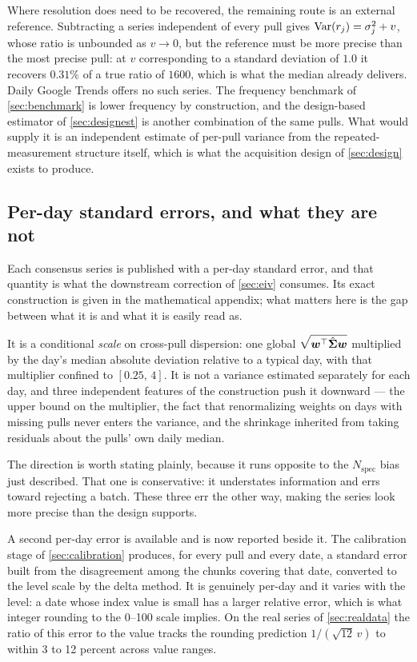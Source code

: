 \documentclass[12pt,a4paper,oneside]{article}
\begin{document}
Where resolution does need to be recovered, the remaining route is an external
reference. Subtracting a series independent of every pull gives
$\operatorname{Var}(r_j)=\sigma_j^2+v$, whose ratio is unbounded as $v\to 0$, but the reference
must be more precise than the most precise pull: at $v$ corresponding to a
standard deviation of $1.0$ it recovers $0.31\%$ of a true ratio of $1600$, which
is what the median already delivers. Daily Google Trends offers no such series.
The frequency benchmark of \cref{sec:benchmark} is lower frequency by
construction, and the design-based estimator of \cref{sec:designest} is another
combination of the same pulls. What would supply it is an independent estimate of
per-pull variance from the repeated-measurement structure itself, which is what
the acquisition design of \cref{sec:design} exists to produce.

\subsection{Per-day standard errors, and what they are not}\label{sec:dailyse}

Each consensus series is published with a per-day standard error, and that
quantity is what the downstream correction of \cref{sec:eiv} consumes. Its exact
construction is given in the mathematical appendix; what matters here is the gap
between what it is and what it is easily read as.

It is a conditional \emph{scale} on cross-pull dispersion: one global
$\sqrt{\bm{w}^{\top}\hat{\bm{\Sigma}}\bm{w}}$ multiplied by the day's median absolute
deviation relative to a typical day, with that multiplier confined to
$[0.25,\,4]$. It is not a variance estimated separately for each day, and three
independent features of the construction push it downward --- the upper bound on
the multiplier, the fact that renormalizing weights on days with missing pulls
never enters the variance, and the shrinkage inherited from taking residuals
about the pulls' own daily median.

The direction is worth stating plainly, because it runs opposite to the
$N_{\text{spec}}$ bias just described. That one is conservative: it understates
information and errs toward rejecting a batch. These three err the other way,
making the series look more precise than the design supports.

A second per-day error is available and is now reported beside it. The calibration
stage of \cref{sec:calibration} produces, for every pull and every date, a standard
error built from the disagreement among the chunks covering that date, converted to
the level scale by the delta method. It is genuinely per-day and it varies with the
level: a date whose index value is small has a larger relative error, which is what
integer rounding to the 0--100 scale implies. On the real series of
\cref{sec:realdata} the ratio of this error to the value tracks the rounding
prediction $1/(\sqrt{12}\,v)$ to within 3 to 12 percent across value ranges.
\end{document}
